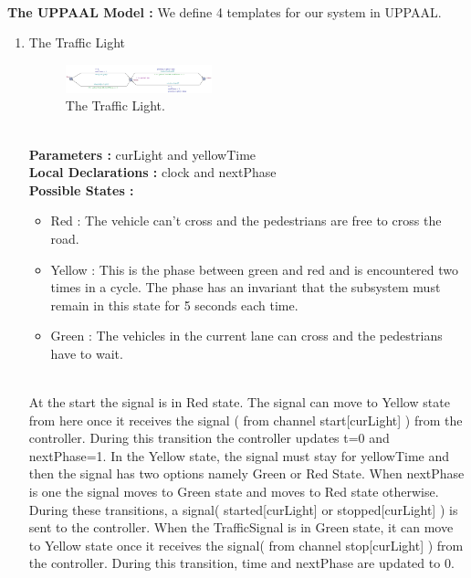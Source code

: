 \documentclass[conference]{IEEEtran}
\begin{document}
\\
\noindent \textbf{The UPPAAL Model :}
We define 4 templates for our system in UPPAAL.
\\
\begin{enumerate}
    \item The Traffic Light
    \begin{figure}[h]
        \centering
        \includegraphics[width=0.4\textwidth]{Fig 4.png}
    \caption{The Traffic Light.}
    \end{figure}
    \\
    \textbf{Parameters :} curLight and yellowTime
    \\
    \textbf{Local Declarations :} clock and nextPhase
    \\
    \textbf{Possible States :}
    \begin{itemize}
        \item Red : The vehicle can’t cross and the pedestrians are free to cross the road.
        \item Yellow : This is the phase between green and red and is encountered two times in a cycle. The phase has an invariant that the subsystem must remain in this state for 5 seconds each time.
        \item Green : The vehicles in the current lane can cross and the pedestrians have to wait.

    \end{itemize}
    \\
    At the start the signal is in Red state. The signal can move to Yellow state from here once it receives the signal ( from channel start[curLight] ) from the controller. During this transition the controller updates t=0 and nextPhase=1. In the Yellow state, the signal must stay for yellowTime and then the signal has two options namely Green or Red State. When nextPhase is one the signal moves to Green state and moves to Red state otherwise. During these transitions, a signal( started[curLight] or stopped[curLight] ) is sent to the controller. When the TrafficSignal is in Green state, it can move to Yellow state once it receives the signal( from channel stop[curLight] ) from the controller. During this transition, time and nextPhase are updated to 0.
    \\
    

\end{enumerate}
\end{document}
